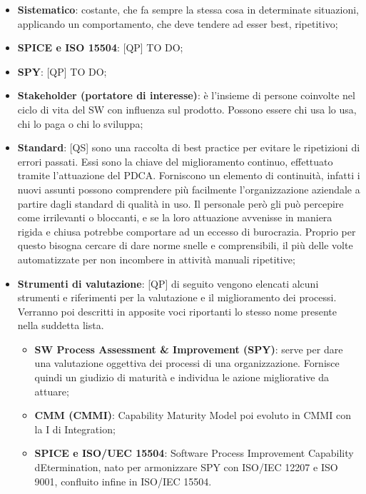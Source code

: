 \begin{itemize}
	\item \textbf{Sistematico}: costante, che fa sempre la stessa cosa in determinate situazioni, applicando un comportamento, che deve tendere ad esser best, ripetitivo;
	\item \textbf{SPICE e ISO 15504}: [QP] TO DO;

	\item \textbf{SPY}: [QP] TO DO;

	\item \textbf{Stakeholder (portatore di interesse)}: è l'insieme di persone coinvolte nel ciclo di vita del SW con influenza sul prodotto. \newline
	Possono essere chi usa lo usa, chi lo paga o chi lo sviluppa;
	\item \textbf{Standard}: [QS] sono una raccolta di best practice per evitare le ripetizioni di errori passati. Essi sono la chiave del miglioramento continuo, effettuato tramite l'attuazione del PDCA. \newline
	Forniscono un elemento di continuità, infatti i nuovi assunti possono comprendere più facilmente l'organizzazione aziendale a partire dagli standard di qualità in uso. \newline
	Il personale però gli può percepire come irrilevanti o bloccanti, e se la loro attuazione avvenisse in maniera rigida e chiusa potrebbe comportare ad un eccesso di burocrazia. Proprio per questo bisogna cercare di dare norme snelle e comprensibili, il più delle volte automatizzate per non incombere in attività manuali ripetitive;
	\item \textbf{Strumenti di valutazione}: [QP] di seguito vengono elencati alcuni strumenti e riferimenti per la valutazione e il miglioramento dei processi. Verranno poi descritti in apposite voci riportanti lo stesso nome presente nella suddetta lista.
		\begin{itemize}
			\item \textbf{SW Process Assessment \& Improvement (SPY)}: serve per dare una valutazione oggettiva dei processi di una organizzazione. Fornisce quindi un giudizio di maturità e individua le azione migliorative da attuare;
			\item \textbf{CMM (CMMI)}: Capability Maturity Model poi evoluto in CMMI con la I di Integration;
			\item \textbf{SPICE e ISO/UEC 15504}: Software Process Improvement Capability dEtermination, nato per armonizzare SPY con ISO/IEC 12207 e ISO 9001, confluito infine in ISO/IEC 15504.
		\end{itemize}
\end{itemize}
